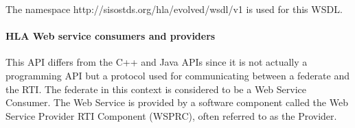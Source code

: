 \begin{compactstdpage}
    The namespace http://sisostds.org/hla/evolved/wsdl/v1 is used for this WSDL.

    \paragraph{HLA Web service consumers and providers}

    This API differs from the C++ and Java APIs since it is not actually a programming API but a protocol used for communicating between a federate and the RTI. The federate in this context is considered to be a Web Service Consumer. The Web Service is provided by a software component called the Web Service Provider RTI Component (WSPRC), often referred to as the Provider.

\end{compactstdpage}

\clearpage

